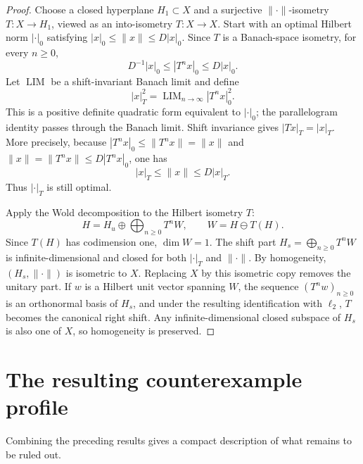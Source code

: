 \documentclass[11pt]{article}
\theoremstyle{definition}
\begin{document}
\begin{proof}
Choose a closed hyperplane $H_1\subset X$ and a surjective
$\|\cdot\|$-isometry $T:X\to H_1$, viewed as an into-isometry $T:X\to X$.
Start with an optimal Hilbert norm $|\cdot|_0$ satisfying
$|x|_0\leq\|x\|\leq D|x|_0$.  Since $T$ is a Banach-space isometry, for every
$n\geq0$,
\[
 D^{-1}|x|_0\leq |T^nx|_0\leq D|x|_0.
\]
Let $\operatorname{LIM}$ be a shift-invariant Banach limit and define
\[
 |x|_T^2=\operatorname{LIM}_{n\to\infty}|T^nx|_0^2.
\]
This is a positive definite quadratic form equivalent to $|\cdot|_0$; the
parallelogram identity passes through the Banach limit.  Shift invariance gives
$|Tx|_T=|x|_T$.  More precisely, because
$|T^nx|_0\leq\|T^nx\|=\|x\|$ and
$\|x\|=\|T^nx\|\leq D|T^nx|_0$, one has
\[
 |x|_T\leq\|x\|\leq D|x|_T.
\]
Thus $|\cdot|_T$ is still optimal.

Apply the Wold decomposition to the Hilbert isometry $T$:
\[
 H=H_u\oplus\bigoplus_{n\geq0}T^nW,
 \qquad W=H\ominus T(H).
\]
Since $T(H)$ has codimension one, $\dim W=1$.  The shift part
$H_s=\bigoplus_{n\geq0}T^nW$ is infinite-dimensional and closed for both
$|\cdot|_T$ and $\|\cdot\|$.  By homogeneity, $(H_s,\|\cdot\|)$ is isometric
to $X$.  Replacing $X$ by this isometric copy removes the unitary part.  If
$w$ is a Hilbert unit vector spanning $W$, the sequence $(T^nw)_{n\geq0}$ is an
orthonormal basis of $H_s$, and under the resulting identification with
$\ell_2$, $T$ becomes the canonical right shift.  Any infinite-dimensional
closed subspace of $H_s$ is also one of $X$, so homogeneity is preserved.
\end{proof}

\section{The resulting counterexample profile}\label{sec:profile}

Combining the preceding results gives a compact description of what remains to
be ruled out.
\end{document}
